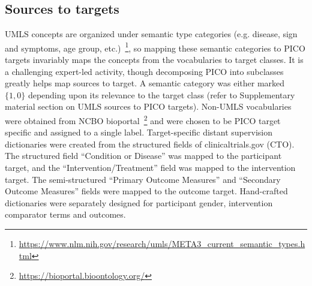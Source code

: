 \documentclass[10.7pt,]{article}
\begin{document}
\subsection{Sources to targets}\label{s2t}
%
UMLS concepts are organized under semantic type categories (e.g. disease, sign and symptoms, age group, etc.)~\footnote{\url{https://www.nlm.nih.gov/research/umls/META3_current_semantic_types.html}}, so mapping these semantic categories to PICO targets invariably maps the concepts from the vocabularies to target classes.
It is a challenging expert-led activity, though decomposing PICO into subclasses greatly helps map sources to target.
A semantic category was either marked $\{1, 0\}$ depending upon its relevance to the target class (refer to Supplementary material section on UMLS sources to PICO targets).
Non-UMLS vocabularies were obtained from NCBO bioportal~\footnote{\url{https://bioportal.bioontology.org/}} and were chosen to be PICO target specific and assigned to a single label.
Target-specific distant supervision dictionaries were created from the structured fields of clinicaltrials.gov (CTO). 
The structured field ``Condition or Disease'' was mapped to the participant target, and the ``Intervention/Treatment'' field was mapped to the intervention target.
The semi-structured ``Primary Outcome Measures'' and ``Secondary Outcome Measures'' fields were mapped to the outcome target.
Hand-crafted dictionaries were separately designed for participant gender, intervention comparator terms and outcomes.
%
%
%
\end{document}
